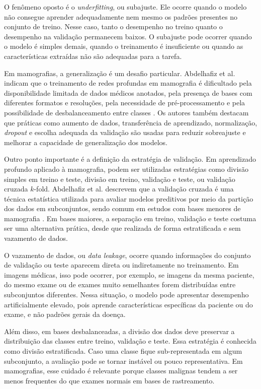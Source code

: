 \documentclass[
    12pt,
    openright,
    oneside,
    a4paper,
    english,
    brazil
]{abntex2}
\begin{document}
O fenômeno oposto é o \textit{underfitting}, ou subajuste. Ele ocorre quando o modelo não consegue aprender adequadamente nem mesmo os padrões presentes no conjunto de treino. Nesse caso, tanto o desempenho no treino quanto o desempenho na validação permanecem baixos. O subajuste pode ocorrer quando o modelo é simples demais, quando o treinamento é insuficiente ou quando as características extraídas não são adequadas para a tarefa.

Em mamografias, a generalização é um desafio particular. Abdelhafiz et al. indicam que o treinamento de redes profundas em mamografia é dificultado pela disponibilidade limitada de dados médicos anotados, pela presença de bases com diferentes formatos e resoluções, pela necessidade de pré-processamento e pela possibilidade de desbalanceamento entre classes \cite{abdelhafiz2019}. Os autores também destacam que práticas como aumento de dados, transferência de aprendizado, normalização, \textit{dropout} e escolha adequada da validação são usadas para reduzir sobreajuste e melhorar a capacidade de generalização dos modelos.

Outro ponto importante é a definição da estratégia de validação. Em aprendizado profundo aplicado à mamografia, podem ser utilizadas estratégias como divisão simples em treino e teste, divisão em treino, validação e teste, ou validação cruzada \(k\)-fold. Abdelhafiz et al. descrevem que a validação cruzada é uma técnica estatística utilizada para avaliar modelos preditivos por meio da partição dos dados em subconjuntos, sendo comum em estudos com bases menores de mamografia \cite{abdelhafiz2019}. Em bases maiores, a separação em treino, validação e teste costuma ser uma alternativa prática, desde que realizada de forma estratificada e sem vazamento de dados.

O vazamento de dados, ou \textit{data leakage}, ocorre quando informações do conjunto de validação ou teste aparecem direta ou indiretamente no treinamento. Em imagens médicas, isso pode ocorrer, por exemplo, se imagens da mesma paciente, do mesmo exame ou de exames muito semelhantes forem distribuídas entre subconjuntos diferentes. Nessa situação, o modelo pode apresentar desempenho artificialmente elevado, pois aprende características específicas da paciente ou do exame, e não padrões gerais da doença.

Além disso, em bases desbalanceadas, a divisão dos dados deve preservar a distribuição das classes entre treino, validação e teste. Essa estratégia é conhecida como divisão estratificada. Caso uma classe fique sub-representada em algum subconjunto, a avaliação pode se tornar instável ou pouco representativa. Em mamografias, esse cuidado é relevante porque classes malignas tendem a ser menos frequentes do que exames normais em bases de rastreamento.
\end{document}
